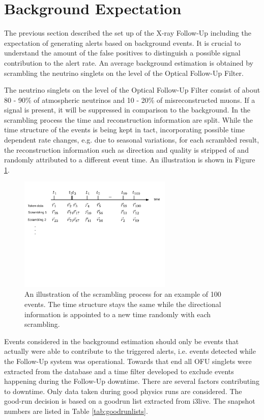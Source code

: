 \section{Background Expectation}
The previous section described the set up of the X-ray Follow-Up including the 
expectation of generating alerts based on background events. It is 
crucial to understand the amount of the false positives to distinguish a 
possible signal contribution to the alert rate. An average background 
estimation is obtained by scrambling the neutrino singlets on the level of the 
Optical Follow-Up Filter.

The neutrino singlets on the level of the Optical Follow-Up Filter consist of 
about 80 - 90\% 
of atmospheric neutrinos and 10 - 20\% of 
misreconstructed muons. If a signal is present, it will be suppressed  in 
comparison to the background. 
In the scrambling process the time and reconstruction information are split. 
While the time structure of the events is being kept in tact, incorporating 
possible time dependent rate changes, e.g. due to seasonal variations, for each 
scrambled result, the reconstruction information such as direction and quality 
is stripped of and randomly attributed to a different event time. An 
illustration is shown in Figure \ref{fig:scrambling_illustration}.
\begin{figure}[h]
 \centering
\includegraphics[trim=0cm 10.5cm 1cm 
1cm,clip=true,width=0.65\textwidth]{fig/scrambling_illustration.pdf}
\caption{An illustration of the scrambling process for an example of 100 
events. The time structure stays the same while the directional information is 
appointed to a new time randomly with each scrambling.}
\label{fig:scrambling_illustration}
\end{figure}

Events considered in the background estimation should only be events that 
actually were able to contribute to the triggered alerts, i.e. events detected 
while the Follow-Up system was operational. Towards that end all OFU singlets 
were extracted from the database and a time filter 
developed to exclude events happening during the Follow-Up downtime.
There are several factors contributing to downtime.
Only data 
taken during good physics runs are considered. The good-run decision is based 
on a goodrun list extracted from i3live. The snapshot numbers are listed in 
 Table \ref{tab:goodrunlists}.

